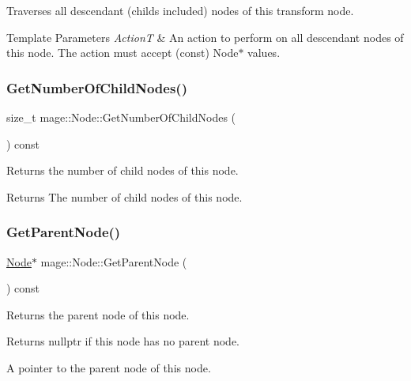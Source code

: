 Traverses all descendant (childs included) nodes of this transform node.


\begin{DoxyTemplParams}{Template Parameters}
{\em ActionT} & An action to perform on all descendant nodes of this node. The action must accept ({\ttfamily const}) {\ttfamily Node$\ast$} values. \\
\hline
\end{DoxyTemplParams}
\hypertarget{classmage_1_1_node_ab4fff9779c09d873abcf881b6ff85d9e}{}\label{classmage_1_1_node_ab4fff9779c09d873abcf881b6ff85d9e} 
\subsubsection{\texorpdfstring{Get\+Number\+Of\+Child\+Nodes()}{GetNumberOfChildNodes()}}
{\footnotesize\ttfamily size\+\_\+t mage\+::\+Node\+::\+Get\+Number\+Of\+Child\+Nodes (\begin{DoxyParamCaption}{ }\end{DoxyParamCaption}) const\hspace{0.3cm}{\ttfamily [noexcept]}}

Returns the number of child nodes of this node.

\begin{DoxyReturn}{Returns}
The number of child nodes of this node. 
\end{DoxyReturn}
\hypertarget{classmage_1_1_node_a21ba704ed3af4c80d096ad5f393da8e0}{}\label{classmage_1_1_node_a21ba704ed3af4c80d096ad5f393da8e0} 
\subsubsection{\texorpdfstring{Get\+Parent\+Node()}{GetParentNode()}}
{\footnotesize\ttfamily \hyperlink{classmage_1_1_node}{Node}$\ast$ mage\+::\+Node\+::\+Get\+Parent\+Node (\begin{DoxyParamCaption}{ }\end{DoxyParamCaption}) const\hspace{0.3cm}{\ttfamily [noexcept]}}

Returns the parent node of this node.

\begin{DoxyReturn}{Returns}
{\ttfamily nullptr} if this node has no parent node. 

A pointer to the parent node of this node. 
\end{DoxyReturn}
\hypertarget{classmage_1_1_node_ab789d7674ed06d3e10114dd6d4b4334c}{}\label{classmage_1_1_node_ab789d7674ed06d3e10114dd6d4b4334c} 
